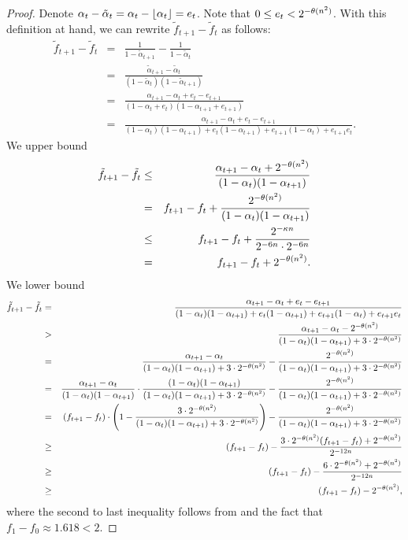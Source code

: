 \documentclass[11pt]{article}
\newcommand{\tf}{\tilde{f}}
\newcommand{\talpha}{\tilde{\alpha}}
\begin{document}
\begin{proof}
Denote $\alpha_t - \talpha_t = \alpha_t - \floor{\alpha_t} = e_t$. Note that $0 \le e_t < 2^{-\theta(n^2)}$. With this definition at hand, we can rewrite $\tilde{f}_{t+1}-\tilde{f}_t$ as follows:
\begin{eqnarray*}
    \tf_{t+1} - \tf_t 
    &=&
    \frac{1}{1-\talpha_{t+1}} - \frac{1}{1-\talpha_t} \\
    &=&
    \frac{\talpha_{t+1} - \talpha_t}{(1-\talpha_t)(1-\talpha_{t+1})} \\
    &=&
    \frac{\alpha_{t+1} - \alpha_t + e_t - e_{t+1}}{(1-\alpha_t + e_t)(1-\alpha_{t+1} + e_{t+1})} \\
    &=&
    \frac{\alpha_{t+1} - \alpha_t + e_t - e_{t+1}}{(1-\alpha_t)(1-\alpha_{t+1}) + e_t(1-\alpha_{t+1}) + e_{t+1}(1-\alpha_t) + e_{t+1}e_{t}}. 
\end{eqnarray*}
We upper bound
\begin{eqnarray*}
     \tf_{t+1} - \tf_t 
    &\le&
    \frac{\alpha_{t+1} - \alpha_t + 2^{-\tn}}{(1-\alpha_t)(1-\alpha_{t+1})} \\
    &=&
    f_{t+1} - f_t + \frac{2^{-\tn}}{(1-\alpha_t)(1-\alpha_{t+1})} \\
    &\le&
    f_{t+1} - f_t + \frac{2^{-\kappa n}}{2^{-6n}\cdot 2^{-6n}} \\
    &=&
    f_{t+1} - f_t + 2^{-\tn}.
\end{eqnarray*}
We lower bound
\begin{eqnarray*}
    \tf_{t+1} - \tf_t 
    &=&
    \frac{\alpha_{t+1} - \alpha_t + e_t - e_{t+1}}{(1-\alpha_t)(1-\alpha_{t+1}) + e_t(1-\alpha_{t+1}) + e_{t+1}(1-\alpha_t) + e_{t+1}e_{t}} \\
    &>&
    \frac{\alpha_{t+1} - \alpha_t - 2^{-\tn}}{(1-\alpha_t)(1-\alpha_{t+1}) + 3\cdot 2^{-\tn}} \\
    &=& 
    \frac{\alpha_{t+1} - \alpha_t}{(1-\alpha_t)(1-\alpha_{t+1}) + 3\cdot2^{-\tn}} -\frac{2^{-\tn}}{(1-\alpha_t)(1-\alpha_{t+1}) + 3\cdot 2^{-\tn}} \\
    &=&
    \frac{\alpha_{t+1} - \alpha_t}{(1-\alpha_t)(1-\alpha_{t+1})}
    \cdot
    \frac{(1-\alpha_t)(1-\alpha_{t+1})}{(1-\alpha_t)(1-\alpha_{t+1}) + 3\cdot2^{-\tn}} 
    -\frac{2^{-\tn}}{(1-\alpha_t)(1-\alpha_{t+1})+ 3\cdot 2^{-\tn}}\\
    &=&
    (f_{t+1} - f_t)
    \cdot
    \left(1 - \frac{3\cdot 2^{-\tn}}{(1-\alpha_t)(1-\alpha_{t+1}) + 3\cdot 2^{-\tn}} \right)
    -\frac{2^{-\tn}}{(1-\alpha_t)(1-\alpha_{t+1})+ 3\cdot 2^{-\tn}} \\
    &\ge&
    (f_{t+1} - f_t)
    -
    \frac{3\cdot 2^{-\tn} (f_{t+1} - f_t) + 2^{-\tn}}{2^{-12n}}\\
    &\ge&
    (f_{t+1} - f_t)
    -
    \frac{6\cdot 2^{-\tn} + 2^{-\tn}}{2^{-12n}} \\
    &\ge&
    (f_{t+1} - f_t)
    -
     2^{-\tn},
\end{eqnarray*}
where the second to last inequality follows from  and the fact that $f_1 - f_0 \approx 1.618 < 2$.
\end{proof}
\end{document}
